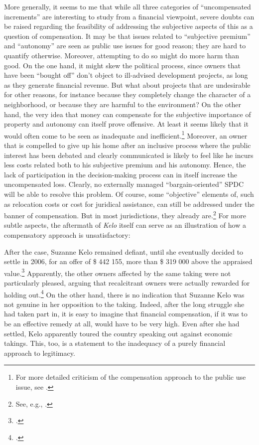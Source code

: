 More generally, it seems to me that while all three categories of ``uncompensated increments'' are interesting to study from a financial viewpoint, severe doubts can be raised regarding the feasibility of addressing the subjective aspects of this as a question of compensation. It may be that issues related to ``subjective premium'' and ``autonomy'' are seen as public use issues for good reason; they are hard to quantify otherwise. Moreover, attempting to do so might do more harm than good. On the one hand, it might skew the political process, since owners that have been ``bought off'' don't object to ill-advised development projects, as long as they generate financial revenue. But what about projects that are undesirable for other reasons, for instance because they completely change the character of a neighborhood, or because they are harmful to the environment? On the other hand, the very idea that money can compensate for the subjective importance of property and autonomy can itself prove offensive. At least it seems likely that it would often come to be seen as inadequate and inefficient.\footnote{For more detailed criticism of the compensation approach to the public use issue, see \cite{garnett06}.} Moreover, an owner that is compelled to give up his home after an inclusive process where the public interest has been debated and clearly communicated is likely to feel like he incurs less costs related both to his subjective premium and his autonomy. Hence, the lack of participation in the decision-making process can in itself increase the uncompensated loss. Clearly, no externally managed ``bargain-oriented'' SPDC will be able to resolve this problem. Of course, some ``objective'' elements of, such as relocation costs or cost for juridical assistance, can still be addressed under the banner of compensation. But in most jurisdictions, they already are.\footnote{See, e.g., \cite[121-126]{garnett06}.} For more subtle aspects, the aftermath of {\it Kelo} itself can serve as an illustration of how a compensatory approach is unsatisfactory:

After the case, Suzanne Kelo remained defiant, until she eventually decided to settle in 2006, for an offer of \$ 442 155, more than \$ 319 000 above the appraised value.\footcite[1709]{lehavi07} Apparently, the other owners affected by the same taking were not particularly pleased, arguing that recalcitrant owners were actually rewarded for holding out.\footcite[1709]{lehavi07} On the other hand, there is no indication that Suzanne Kelo was not genuine in her opposition to the taking. Indeed, after the long struggle she had taken part in, it is easy to imagine that financial compensation, if it was to be an effective remedy at all, would have to be very high. Even after she had settled, Kelo apparently toured the country speaking out against economic takings. This, too, is a statement to the inadequacy of a purely financial approach to legitimacy. 


